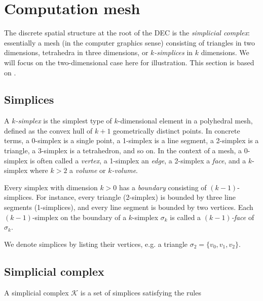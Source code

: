 \documentclass[utf8,english]{gradu3}
\begin{document}


\section{Computation mesh}

The discrete spatial structure at the root of the DEC is the \textit{simplicial complex}:
essentially a mesh (in the computer graphics sense)
consisting of triangles in two dimensions,
tetrahedra in three dimensions, or \textit{$k$-simplices} in $k$ dimensions.
We will focus on the two-dimensional case here for illustration.
This section is based on \parencite{desbrun_discrete_2006}.


\subsection{Simplices}

A \textit{$k$-simplex} is the simplest type of $k$-dimensional element
in a polyhedral mesh, defined as
the convex hull of $k + 1$ geometrically distinct points.
In concrete terms, a 0-simplex is a single point,
a 1-simplex is a line segment, a 2-simplex is a triangle,
a 3-simplex is a tetrahedron, and so on.
In the context of a mesh, a 0-simplex is often called a \textit{vertex},
a 1-simplex an \textit{edge}, a 2-simplex a \textit{face},
and a $k$-simplex where $k > 2$ a \textit{volume} or \textit{$k$-volume}.

Every simplex with dimension $k > 0$
has a \textit{boundary} consisting of $(k-1)$-simplices.
For instance, every triangle (2-simplex) is bounded by three line segments (1-simplices),
and every line segment is bounded by two vertices.
Each $(k-1)$-simplex on the boundary of a $k$-simplex $\sigma_k$
is called a \textit{$(k-1)$-face} of $\sigma_k$.

We denote simplices by listing their vertices, e.g. a triangle
$\sigma_2 = \{v_0, v_1, v_2\}$.


\subsection{Simplicial complex}

A simplicial complex $\mathcal{K}$ is a set of simplices satisfying the rules
\end{document}
